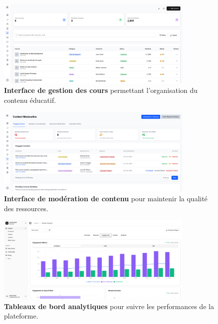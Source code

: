 \begin{figure}[h!]
  \centering
  \includegraphics[width=0.85\textwidth,keepaspectratio]{old-reports/week_4_img/coursmanagement.jpeg}
  \caption{\textbf{Interface de gestion des cours} permettant l'organisation du contenu éducatif.}
  \label{fig:course_management}
\end{figure}

\begin{figure}[h!]
  \centering
  \includegraphics[width=0.85\textwidth,keepaspectratio]{old-reports/week_4_img/contentmod.jpeg}
  \caption{\textbf{Interface de modération de contenu} pour maintenir la qualité des ressources.}
  \label{fig:content_moderation}
\end{figure}

\begin{figure}[h!]
  \centering
  \includegraphics[width=0.85\textwidth,keepaspectratio]{old-reports/week_4_img/analytics.jpeg}
  \caption{\textbf{Tableaux de bord analytiques} pour suivre les performances de la plateforme.}
  \label{fig:analytics_dashboard}
\end{figure}

